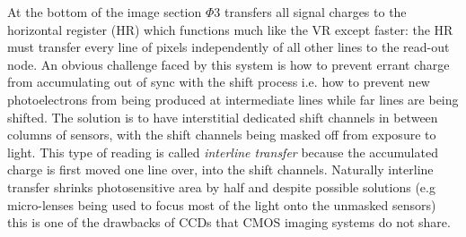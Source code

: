 At the bottom of the image section $\Phi3$ transfers all signal charges to the horizontal register (HR) which functions much like the VR except faster: the HR must transfer every line of pixels independently of all other lines to the read-out node.
%
An obvious challenge faced by this system is how to prevent errant charge from accumulating out of sync with the shift process i.e. how to prevent new photoelectrons from being produced at intermediate lines while far lines are being shifted.
%
The solution is to have interstitial dedicated shift channels in between columns of sensors, with the shift channels being masked off from exposure to light.
%
This type of reading is called \textit{interline transfer} because the accumulated charge is first moved one line over, into the shift channels.
%
Naturally interline transfer shrinks photosensitive area by half and despite possible solutions (e.g micro-lenses being used to focus most of the light onto the unmasked sensors) this is one of the drawbacks of CCDs that CMOS imaging systems do not share.
